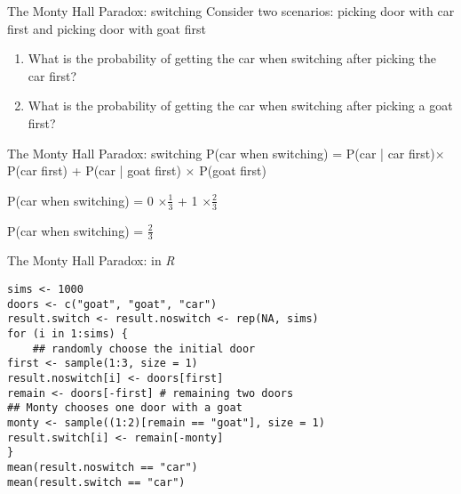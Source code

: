 \documentclass[presentation]{beamer}
\begin{document}
\begin{frame}[label={sec:orgc56e5c2}]{The Monty Hall Paradox: switching}
Consider two scenarios: picking door with car first and picking door with goat first

\begin{enumerate}
\item What is the probability of getting the car when switching after picking the car first?

\item What is the probability of getting the car when switching after picking a goat first?
\end{enumerate}
\end{frame}


\begin{frame}[label={sec:org3f6318e}]{The Monty Hall Paradox: switching}
P(car when switching) = P(car | car first)\(\times\) P(car first) + P(car | goat first) \(\times\) P(goat first)

\pause


P(car when switching) = 0 \(\times \frac{1}{3}\) + 1 \(\times \frac{2}{3}\)

\pause

P(car when switching) = \(\frac{2}{3}\)
\end{frame}


\begin{frame}[fragile,shrink=20,label={sec:org50e3d43}]{The Monty Hall Paradox: in \emph{R}}
 \begin{verbatim}
sims <- 1000
doors <- c("goat", "goat", "car")
result.switch <- result.noswitch <- rep(NA, sims)
for (i in 1:sims) {
    ## randomly choose the initial door
first <- sample(1:3, size = 1)
result.noswitch[i] <- doors[first]
remain <- doors[-first] # remaining two doors
## Monty chooses one door with a goat
monty <- sample((1:2)[remain == "goat"], size = 1)
result.switch[i] <- remain[-monty]
}
mean(result.noswitch == "car")
mean(result.switch == "car")
\end{verbatim}
\end{frame}
\end{document}
